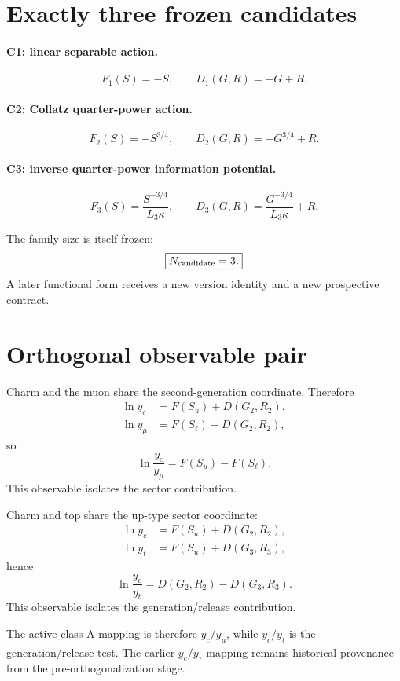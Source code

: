 \section{Exactly three frozen candidates}

\paragraph{C1: linear separable action.}
\[
F_1(S)=-S,
\qquad
D_1(G,R)=-G+R.
\]

\paragraph{C2: Collatz quarter-power action.}
\[
F_2(S)=-S^{3/4},
\qquad
D_2(G,R)=-G^{3/4}+R.
\]

\paragraph{C3: inverse quarter-power information potential.}
\[
F_3(S)=\frac{S^{-3/4}}{L_3\kappa},
\qquad
D_3(G,R)=\frac{G^{-3/4}}{L_3\kappa}+R.
\]

The family size is itself frozen:
\[
\boxed{N_{\rm candidate}=3.}
\]
A later functional form receives a new version identity and a new prospective
contract.

\section{Orthogonal observable pair}

Charm and the muon share the second-generation coordinate.  Therefore
\[
\begin{aligned}
\ln y_c&=F(S_u)+D(G_2,R_2),\\
\ln y_\mu&=F(S_\ell)+D(G_2,R_2),
\end{aligned}
\]
so
\[
\boxed{
\ln\frac{y_c}{y_\mu}=F(S_u)-F(S_\ell).
}
\]
This observable isolates the sector contribution.

Charm and top share the up-type sector coordinate:
\[
\begin{aligned}
\ln y_c&=F(S_u)+D(G_2,R_2),\\
\ln y_t&=F(S_u)+D(G_3,R_3),
\end{aligned}
\]
hence
\[
\boxed{
\ln\frac{y_c}{y_t}
=D(G_2,R_2)-D(G_3,R_3).
}
\]
This observable isolates the generation/release contribution.

The active class-A mapping is therefore \(y_c/y_\mu\), while \(y_c/y_t\) is the
generation/release test.  The earlier \(y_c/y_\tau\) mapping remains historical
provenance from the pre-orthogonalization stage.

